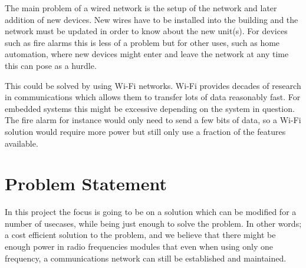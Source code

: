 The main problem of a wired network is the setup of the network and later addition of new devices. 
New wires have to be installed into the building and the network must be updated in order to know about the new unit(s).
For devices such as fire alarms this is less of a problem but for other uses, such as home automation, where new devices might enter and leave the network at any time this can pose as a hurdle.

This could be solved by using Wi-Fi networks.
Wi-Fi provides decades of research in communications which allows them to transfer lots of data reasonably fast.
For embedded systems this might be excessive depending on the system in question.
The fire alarm for instance would only need to send a few bits of data, so a Wi-Fi solution would require more power but still only use a fraction of the features available.






\section{Problem Statement}\label{sec:problemStatement}

In this project the focus is going to be on a solution which can be modified for a number of usecases, while being just enough to solve the problem.
In other words; a cost efficient solution to the problem, and we believe that there might be enough power in radio frequencies modules that even when using only one frequency, a communications network can still be established and maintained.

